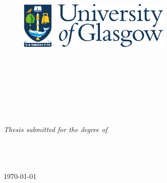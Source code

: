 
\begin{titlepage}
\begin{center}

\begin{figure}
    \begin{center}
    \includegraphics[width=0.65\textwidth]{Figures/logo.pdf}
    \end{center}
\end{figure}

\vspace{1cm}

\HRule \\[0.4cm] 
{\Large \bfseries \ttitle\par}\vspace{0.4cm}
\HRule \\[1.5cm]
    
\begin{minipage}[t]{1.0\textwidth}
\begin{flushleft} \large
\begin{center}
    \Large \authorname\\[2cm]
\end{center}
\end{flushleft}
\end{minipage}\\[1cm]
    
\vfill

\large \textit{Thesis submitted for the degree of \degreename}\\[2cm]

\deptname\\
\collegename\\[0.5cm]
\univname\\[0.9cm]
    
\vfill

{\large \today}\\[4cm] %
    
\vfill
\end{center}
\end{titlepage}
